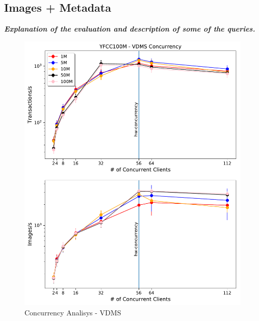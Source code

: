 \subsection{Images + Metadata}

\textbf{\textit{Explanation of the evaluation and description of some of the queries.}}

\begin{figure}[]
\centering
\includegraphics[width=\columnwidth]{figures/concurrency_vdms}
\caption{Concurrency Analisys - VDMS}
\label{fig:concurrency_vdms}
\end{figure}

